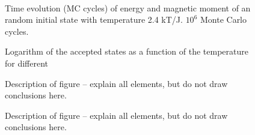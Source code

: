 \documentclass{emulateapj}
\begin{document}
\begin{figure}[t]
\\
\caption{Time evolution (MC cycles) of energy and magnetic moment of an random initial state with temperature 2.4 kT/J. $10^6$ Monte Carlo cycles.}
\end{figure}

\begin{figure}[t]
\mbox{}
\caption{Logarithm of the accepted states as a function of the temperature for different }
\label{fig:logAccepts}
\end{figure}

\begin{figure}[t]
\mbox{}
\caption{Description of figure -- explain all elements, but do not
draw conclusions here.}
\label{fig:figure_label}
\end{figure}

\begin{figure}[t]
\mbox{}
\caption{Description of figure -- explain all elements, but do not
draw conclusions here.}
\label{fig:figure_label}
\end{figure}
\end{document}
